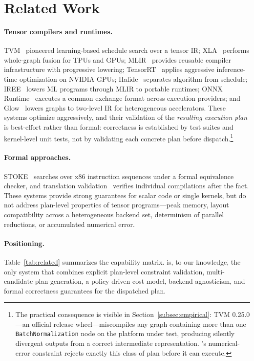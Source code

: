 \section{Related Work}
\label{sec:related}

\paragraph{Tensor compilers and runtimes.}
TVM~\cite{chen2018tvm} pioneered learning-based schedule search over a
tensor IR; XLA~\cite{xla2017} performs whole-graph fusion for TPUs and
GPUs; MLIR~\cite{lattner2021mlir} provides reusable compiler
infrastructure with progressive lowering; TensorRT~\cite{tensorrt2020}
applies aggressive inference-time optimization on NVIDIA GPUs;
Halide~\cite{ragan2013halide} separates algorithm from schedule;
IREE~\cite{iree2022} lowers ML programs through MLIR to portable
runtimes; ONNX Runtime~\cite{onnxruntime2019} executes a common exchange
format across execution providers; and Glow~\cite{glow2018} lowers
graphs to two-level IR for heterogeneous accelerators. These systems
optimize aggressively, and their validation of the \emph{resulting
execution plan} is best-effort rather than formal: correctness is
established by test suites and kernel-level unit tests, not by
validating each concrete plan before dispatch.\footnote{The practical
consequence is visible in Section~\ref{subsec:empirical}: TVM
0.25.0---an official release wheel---miscompiles any graph containing
more than one \texttt{BatchNormalization} node on the platform under
test, producing silently divergent outputs from a correct intermediate
representation. \gate{}'s numerical-error constraint rejects exactly
this class of plan before it can execute.}

\paragraph{Formal approaches.}
STOKE~\cite{stoke2013} searches over x86 instruction sequences
under a formal equivalence checker, and translation
validation~\cite{palsberg1995translation,necula2000translation} verifies
individual compilations after the fact. These systems provide strong
guarantees for scalar code or single kernels, but do not address
plan-level properties of tensor programs---peak memory, layout
compatibility across a heterogeneous backend set, determinism of
parallel reductions, or accumulated numerical error.

\paragraph{Positioning.}
Table~\ref{tab:related} summarizes the capability matrix. \gate{} is,
to our knowledge, the only system that combines explicit plan-level
constraint validation, multi-candidate plan generation, a policy-driven
cost model, backend agnosticism, and formal correctness guarantees for
the dispatched plan.

